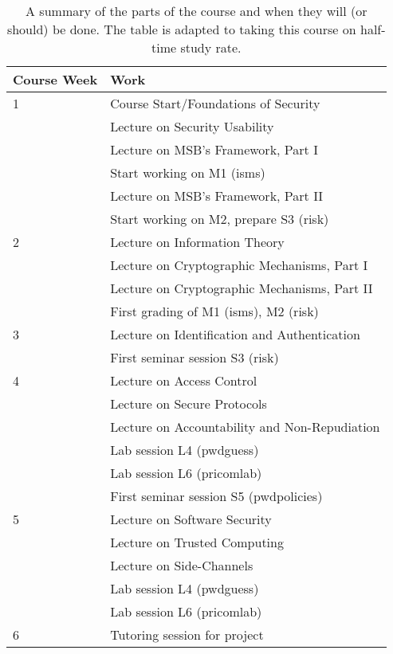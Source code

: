 \begin{table}
	\centering
  \caption{%
    A summary of the parts of the course and when they will (or should) be 
    done.
    The table is adapted to taking this course on half-time study rate.
  }\label{Schedule}
  \begin{tabular}{lp{9cm}}
    \toprule
    \textbf{Course Week}	& \textbf{Work} \\
    \midrule
    1
      & Course Start/Foundations of Security\\
      & Lecture on Security Usability\\
      & Lecture on MSB's Framework, Part I\\
      & Start working on M1 (isms)\\
      & Lecture on MSB's Framework, Part II\\
      & Start working on M2, prepare S3 (risk)\\
    \midrule
    2
      & Lecture on Information Theory\\
      & Lecture on Cryptographic Mechanisms, Part I\\
      & Lecture on Cryptographic Mechanisms, Part II\\
      & First grading of M1 (isms), M2 (risk)\\
    \midrule
    3
      & Lecture on Identification and Authentication\\
      & First seminar session S3 (risk)\\
    \midrule
    4
      & Lecture on Access Control\\
      & Lecture on Secure Protocols\\
      & Lecture on Accountability and Non-Repudiation\\
      & Lab session L4 (pwdguess)\\
      & Lab session L6 (pricomlab)\\
      & First seminar session S5 (pwdpolicies)\\
    \midrule
    5
      & Lecture on Software Security\\
      & Lecture on Trusted Computing\\
      & Lecture on Side-Channels\\
      & Lab session L4 (pwdguess)\\
      & Lab session L6 (pricomlab)\\
    \midrule
    6
      & Tutoring session for project\\

\end{tabular}
\end{table}
